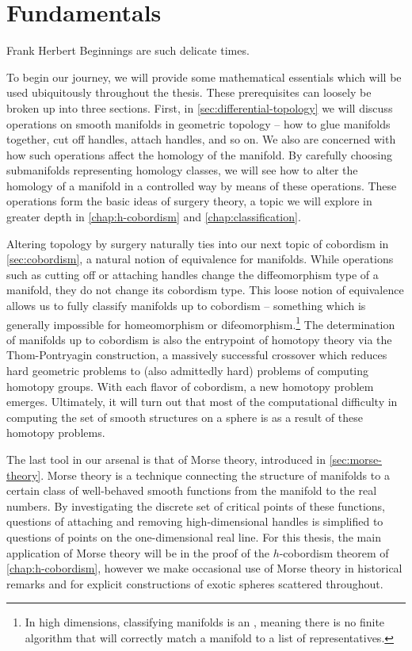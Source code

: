 \chapter{Fundamentals}\label{chap:fundamentals}

\begin{epigraph}{16em}{Frank Herbert}
  Beginnings are such delicate times.
\end{epigraph}

To begin our journey, we will provide some mathematical essentials which will be used ubiquitously throughout the thesis. These prerequisites can loosely be broken up into three sections. First, in \cref{sec:differential-topology} we will discuss operations on smooth manifolds in geometric topology -- how to glue manifolds together, cut off handles, attach handles, and so on. We also are concerned with how such operations affect the homology of the manifold. By carefully choosing submanifolds representing homology classes, we will see how to alter the homology of a manifold in a controlled way by means of these operations. These operations form the basic ideas of surgery theory, a topic we will explore in greater depth in \cref{chap:h-cobordism} and \cref{chap:classification}.

Altering topology by surgery naturally ties into our next topic of cobordism in \cref{sec:cobordism}, a natural notion of equivalence for manifolds. While operations such as cutting off or attaching handles change the diffeomorphism type of a manifold, they do not change its cobordism type. This loose notion of equivalence allows us to fully classify manifolds up to cobordism -- something which is generally impossible for homeomorphism or difeomorphism.\footnote{In high dimensions, classifying manifolds is an , meaning there is no finite algorithm that will correctly match a manifold to a list of representatives.}
The determination of manifolds up to cobordism is also the entrypoint of homotopy theory via the Thom-Pontryagin construction, a massively successful crossover which reduces hard geometric problems to (also admittedly hard) problems of computing homotopy groups. With each flavor of cobordism, a new homotopy problem emerges. Ultimately, it will turn out that most of the computational difficulty in computing the set of smooth structures on a sphere is as a result of these homotopy problems.

The last tool in our arsenal is that of Morse theory, introduced in \cref{sec:morse-theory}. Morse theory is a technique connecting the structure of manifolds to a certain class of well-behaved smooth functions from the manifold to the real numbers. By investigating the discrete set of critical points of these functions, questions of attaching and removing high-dimensional handles is simplified to questions of points on the one-dimensional real line. For this thesis, the main application of Morse theory will be in the proof of the $h$-cobordism theorem of \cref{chap:h-cobordism}, however we make occasional use of Morse theory in historical remarks and for explicit constructions of exotic spheres scattered throughout.

